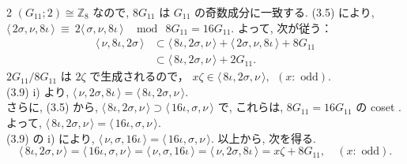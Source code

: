 \documentclass[10pt, leqno]{ltjsarticle}
\newcommand{\todas}[1]{\langle\,#1\,\rangle}
\numberwithin{equation}{section}
\theoremstyle{plain}
\theoremstyle{definition}
\theoremstyle{remark}
\begin{document}
\begin{paracol}{2}
\((G_{11};2)\cong\mathbb Z_8\) なので, 
\(8G_{11}\) は \(G_{11}\) の奇数成分に一致する. 
(3.5) により, \\
\(\todas{2\sigma,\nu,8\iota}\ \equiv\ 2\todas{\sigma,\nu,8\iota}\ \ 
\mod\ 8G_{11} = 16G_{11}.\)
よって, 次が従う：
\[
\begin{align*}
\todas{\nu,8\iota,2\sigma}
& \subset \todas{8\iota,2\sigma,\nu}+\todas{2\sigma,\nu,8\iota}+8G_{11} \\
& \subset \todas{8\iota,2\sigma,\nu}+2G_{11}.
\end{align*}
\]
\(2G_{11}/8G_{11}\) は \(2\zeta\) で生成されるので，
\(x \zeta \in \todas{8\iota,2\sigma,\nu}, \ \ (x:\text{ odd}).\)\\
(3.9) i) より, 
\(\todas{\nu,2\sigma,8\iota}=\todas{8\iota,2\sigma,\nu}.\)\\ 
さらに,  (3.5) から, 
\(\todas{8\iota,2\sigma,\nu}\supset\todas{16\iota,\sigma,\nu}\) で,
これらは, \(8G_{11} = 16G_{11}\) の coset .\\
よって,
\(\todas{8\iota, 2\sigma, \nu} = \todas{16\iota,\sigma,\nu}\). \\
(3.9) の i) により, 
\(\todas{\nu, \sigma, 16\iota} = \todas{16\iota, \sigma, \nu} .\)
以上から, 次を得る.
\begin{equation}
\todas{8\iota,2\sigma,\nu}
=\todas{16\iota,\sigma,\nu}
=\todas{\nu,\sigma,16\iota}
=\todas{\nu,2\sigma,8\iota}
= x\zeta+8G_{11}, \quad (x:\text{ odd}). 
\end{equation}

\switchcolumn


\end{paracol}
\end{document}
